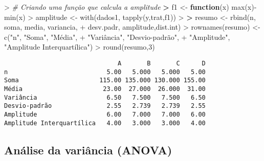 \documentclass[
]{book}
\newenvironment{Shaded}{\begin{snugshade}}{\end{snugshade}}
\newcommand{\CommentTok}[1]{\textcolor[rgb]{0.56,0.35,0.01}{\textit{#1}}}
\newcommand{\ControlFlowTok}[1]{\textcolor[rgb]{0.13,0.29,0.53}{\textbf{#1}}}
\newcommand{\DecValTok}[1]{\textcolor[rgb]{0.00,0.00,0.81}{#1}}
\newcommand{\ErrorTok}[1]{\textcolor[rgb]{0.64,0.00,0.00}{\textbf{#1}}}
\newcommand{\FunctionTok}[1]{\textcolor[rgb]{0.00,0.00,0.00}{#1}}
\newcommand{\NormalTok}[1]{#1}
\newcommand{\OtherTok}[1]{\textcolor[rgb]{0.56,0.35,0.01}{#1}}
\newcommand{\SpecialCharTok}[1]{\textcolor[rgb]{0.00,0.00,0.00}{#1}}
\newcommand{\StringTok}[1]{\textcolor[rgb]{0.31,0.60,0.02}{#1}}
\begin{document}
\begin{Shaded}
\begin{Highlighting}[]
\SpecialCharTok{\textgreater{}} \CommentTok{\#\textquotesingle{} Criando uma função que calcula a amplitude}
\ErrorTok{\textgreater{}}\NormalTok{ f1 }\OtherTok{\textless{}{-}} \ControlFlowTok{function}\NormalTok{(x) }\FunctionTok{max}\NormalTok{(x)}\SpecialCharTok{{-}}\FunctionTok{min}\NormalTok{(x)}
\SpecialCharTok{\textgreater{}}\NormalTok{ amplitude }\OtherTok{\textless{}{-}} \FunctionTok{with}\NormalTok{(dados1, }\FunctionTok{tapply}\NormalTok{(y,trat,f1))}
\SpecialCharTok{\textgreater{}} 
\ErrorTok{\textgreater{}}\NormalTok{ resumo }\OtherTok{\textless{}{-}} \FunctionTok{rbind}\NormalTok{(n, soma, media, variancia,}
\SpecialCharTok{+}\NormalTok{                 desv.padr, amplitude,dist.int)}
\SpecialCharTok{\textgreater{}} \FunctionTok{rownames}\NormalTok{(resumo) }\OtherTok{\textless{}{-}} \FunctionTok{c}\NormalTok{(}\StringTok{"n"}\NormalTok{, }\StringTok{"Soma"}\NormalTok{, }\StringTok{"Média"}\NormalTok{, }
\SpecialCharTok{+}                       \StringTok{"Variância"}\NormalTok{, }\StringTok{"Desvio{-}padrão"}\NormalTok{, }
\SpecialCharTok{+}                       \StringTok{"Amplitude"}\NormalTok{, }\StringTok{"Amplitude Interquartílica"}\NormalTok{)}
\SpecialCharTok{\textgreater{}} \FunctionTok{round}\NormalTok{(resumo,}\DecValTok{3}\NormalTok{)}
\end{Highlighting}
\end{Shaded}

\begin{verbatim}
                               A       B       C      D
n                           5.00   5.000   5.000   5.00
Soma                      115.00 135.000 130.000 155.00
Média                      23.00  27.000  26.000  31.00
Variância                   6.50   7.500   7.500   6.50
Desvio-padrão               2.55   2.739   2.739   2.55
Amplitude                   6.00   7.000   7.000   6.00
Amplitude Interquartílica   4.00   3.000   3.000   4.00
\end{verbatim}

\hypertarget{anuxe1lise-da-variuxe2ncia-anova}{%
\subsection{Análise da variância (ANOVA)}\label{anuxe1lise-da-variuxe2ncia-anova}}
\end{document}
